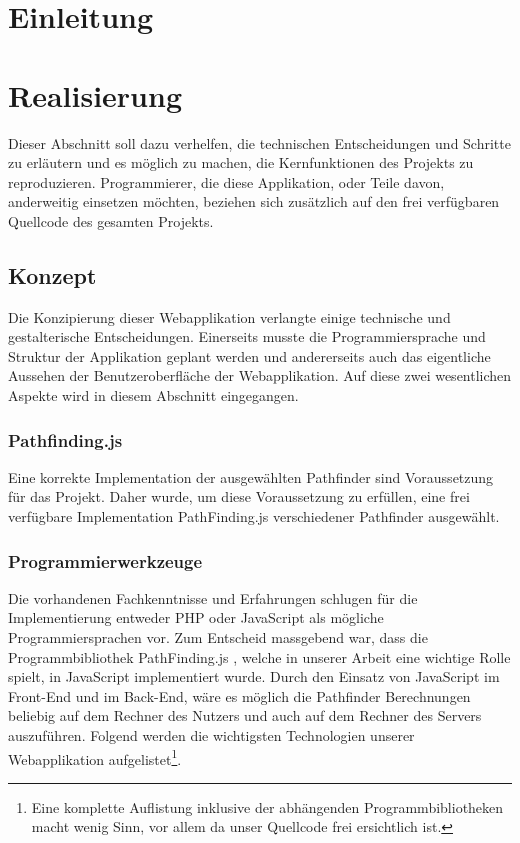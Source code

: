 \documentclass[12pt,a4paper,german]{report}
\begin{document}




\tableofcontents{}


\chapter{Einleitung}

\chapter{Realisierung}
Dieser Abschnitt soll dazu verhelfen, die technischen Entscheidungen und Schritte zu erläutern und es möglich zu machen, die Kernfunktionen des Projekts zu reproduzieren. Programmierer, die diese Applikation, oder Teile davon, anderweitig einsetzen möchten, beziehen sich zusätzlich auf den frei verfügbaren Quellcode\cite{bma} des gesamten Projekts.
\section{Konzept}
Die Konzipierung dieser Webapplikation verlangte einige technische und gestalterische Entscheidungen. 
Einerseits musste die Programmiersprache und Struktur der Applikation geplant werden und andererseits auch das eigentliche Aussehen der Benutzeroberfläche der Webapplikation. 
Auf diese zwei wesentlichen Aspekte wird in diesem Abschnitt eingegangen.
\subsection{Pathfinding.js}
Eine korrekte Implementation der ausgewählten Pathfinder sind Voraussetzung für das Projekt. 
Daher wurde, um diese Voraussetzung zu erfüllen, eine frei verfügbare Implementation PathFinding.js \cite{pfjs} verschiedener Pathfinder ausgewählt.
\subsection{Programmierwerkzeuge}
Die vorhandenen Fachkenntnisse und Erfahrungen schlugen für die Implementierung entweder PHP oder JavaScript als mögliche Programmiersprachen vor. 
Zum Entscheid massgebend war, dass die Programmbibliothek PathFinding.js \cite{pfjs}, welche in unserer Arbeit eine wichtige Rolle spielt, in JavaScript implementiert wurde. 
Durch den Einsatz von JavaScript im Front-End und im Back-End, wäre es möglich die Pathfinder Berechnungen beliebig auf dem Rechner des Nutzers und auch auf dem Rechner des Servers auszuführen. 
Folgend werden die wichtigsten Technologien unserer Webapplikation aufgelistet\footnote{Eine komplette Auflistung inklusive der abhängenden Programmbibliotheken macht wenig Sinn, vor allem da unser Quellcode frei ersichtlich ist.}.
\end{document}
